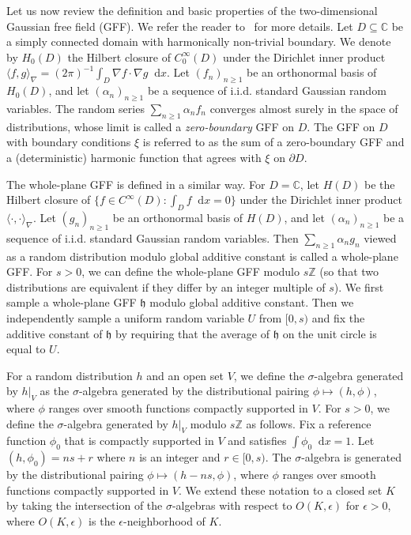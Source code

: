 \documentclass[a4paper]{article}
\numberwithin{equation}{section}
\numberwithin{equation}{section}
\renewcommand{\1}{\mathbf{1}}
\newcommand\dd{\mathop{}\!\mathrm{d}} %
\begin{document}
Let us now review the definition and basic properties of the two-dimensional Gaussian free field (GFF). We refer the reader to~\cite{Sheffield-gff-notes, Dubedat-SLE-GFF, WP-gff-notes} for more details. Let $D \subseteq \mathbb C$ be a simply connected domain with harmonically non-trivial boundary. We denote by $H_0(D)$ the Hilbert closure of $C_0^\infty(D)$ under the Dirichlet inner product $\langle f,g \rangle_\nabla=(2\pi)^{-1} \int_D \nabla f \cdot \nabla g \dd x$. Let $(f_n)_{n \ge 1}$ be an orthonormal basis of $H_0(D)$, and let $(\alpha_n)_{n \ge 1}$ be a sequence of i.i.d. standard Gaussian random variables. The random series $\sum_{n \ge 1} \alpha_n f_n$ converges almost surely in the space of distributions, whose limit is called a \emph{zero-boundary} GFF on $D$. The GFF on $D$ with boundary conditions $\xi$ is referred to as the sum of a zero-boundary GFF and a (deterministic) harmonic function that agrees with $\xi$ on $\partial D$.

The whole-plane GFF is defined in a similar way. For $D=\mathbb C$, let $H(D)$ be the Hilbert closure of $\{f \in C^\infty(D): \int_D f \dd x=0\}$ under the Dirichlet inner product $\langle \cdot,\cdot \rangle_\nabla$. Let $(g_n)_{n \ge 1}$ be an orthonormal basis of $H(D)$, and let $(\alpha_n)_{n \ge 1}$ be a sequence of i.i.d. standard Gaussian random variables. Then $\sum_{n \ge 1} \alpha_n g_n$ viewed as a random distribution modulo global additive constant is called a whole-plane GFF. For $s>0$, we can define the whole-plane GFF modulo $s\mathbb Z$ (so that two distributions are equivalent if they differ by an integer multiple of $s$). We first sample a whole-plane GFF $\mathfrak h$ modulo global additive constant. Then we independently sample a uniform random variable $U$ from $[0,s)$ and fix the additive constant of $\mathfrak h$ by requiring that the average of $\mathfrak h$ on the unit circle is equal to $U$. 

For a random distribution $h$ and an open set $V$, we define the $\sigma$-algebra generated by $h|_V$ as the $\sigma$-algebra generated by the distributional pairing $\phi \mapsto (h, \phi)$, where $\phi$ ranges over smooth functions compactly supported in $V$. For $s>0$, we define the $\sigma$-algebra generated by $h|_V$ modulo $s \mathbb Z$ as follows. Fix a reference function $\phi_0$ that is compactly supported in $V$ and satisfies $\int \phi_0 \dd x = 1$. Let $(h,\phi_0) = ns + r$ where $n$ is an integer and $r \in [0,s)$. The $\sigma$-algebra is generated by the distributional pairing $\phi \mapsto (h - ns, \phi)$, where $\phi$ ranges over smooth functions compactly supported in $V$. We extend these notation to a closed set $K$ by taking the intersection of the $\sigma$-algebras with respect to $O(K,\epsilon)$ for $\epsilon>0$, where $O(K,\epsilon)$ is the $\epsilon$-neighborhood of $K$.
\end{document}
